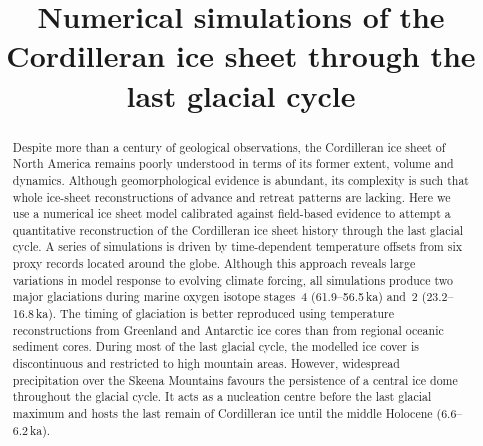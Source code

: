 \documentclass[tc]{copernicus}
\begin{document}

\title{Numerical simulations of the Cordilleran ice sheet
       through the last glacial cycle}




\received{}
\pubdiscuss{}
\revised{}
\accepted{}
\published{}

\maketitle

\begin{abstract}

  Despite more than a century of geological observations, the Cordilleran ice
  sheet of North America remains poorly understood in terms of its former
  extent, volume and dynamics. Although geomorphological evidence is abundant,
  its complexity is such that whole ice-sheet reconstructions of advance and
  retreat patterns are lacking. Here we use a numerical ice sheet model
  calibrated against field-based evidence to attempt a quantitative
  reconstruction of the Cordilleran ice sheet history through the last glacial
  cycle. A series of simulations is driven by time-dependent temperature
  offsets from six proxy records located around the globe. Although this
  approach reveals large variations in model response to evolving climate
  forcing, all simulations produce two major glaciations during
  marine oxygen isotope stages~4 (61.9--56.5\,ka) and~2
  (23.2--16.8\,ka). The timing of glaciation is
  better reproduced using temperature reconstructions from Greenland and
  Antarctic ice cores than from regional oceanic sediment cores. During most of
  the last glacial cycle, the modelled ice cover is discontinuous and
  restricted to high mountain areas. However, widespread precipitation over the
  Skeena Mountains favours the persistence of a central ice dome throughout the
  glacial cycle. It acts as a nucleation centre before the last glacial maximum
  and hosts the last remain of Cordilleran ice until the middle Holocene
  (6.6--6.2\,ka).

\end{abstract}
\end{document}
